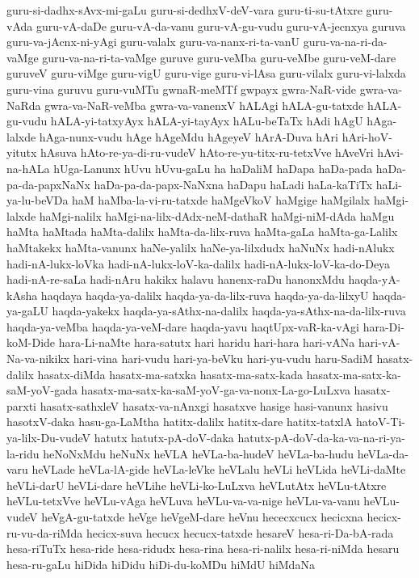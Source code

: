 {guru-si-dadhx-sAvx-mi-gaLu
guru-si-dedhxV-deV-vara
guru-ti-su-tAtxre
guru-vAda
guru-vA-daDe
guru-vA-da-vanu
guru-vA-gu-vudu
guru-vA-jecnxya
guruva
guru-va-jAcnx-ni-yAgi
guru-valalx
guru-va-nanx-ri-ta-vanU
guru-va-na-ri-da-vaMge
guru-va-na-ri-ta-vaMge
guruve
guru-veMba
guru-veMbe
guru-veM-dare
guruveV
guru-viMge
guru-vigU
guru-vige
guru-vi-lAsa
guru-vilalx
guru-vi-lalxda
guru-vina
guruvu
guru-vuMTu
gwnaR-meMTf
gwpayx
gwra-NaR-vide
gwra-va-NaRda
gwra-va-NaR-veMba
gwra-va-vanenxV
hALAgi
hALA-gu-tatxde
hALA-gu-vudu
hALA-yi-tatxyAyx
hALA-yi-tayAyx
hALu-beTaTx
hAdi
hAgU
hAga-lalxde
hAga-nunx-vudu
hAge
hAgeMdu
hAgeyeV
hArA-Duva
hAri
hAri-hoV-yitutx
hAsuva
hAto-re-ya-di-ru-vudeV
hAto-re-yu-titx-ru-tetxVve
hAveVri
hAvi-na-hALa
hUga-Lanunx
hUvu
hUvu-gaLu
ha
haDaliM
haDapa
haDa-pada
haDa-pa-da-papxNaNx
haDa-pa-da-papx-NaNxna
haDapu
haLadi
haLa-kaTiTx
haLi-ya-lu-beVDa
haM
haMba-la-vi-ru-tatxde
haMgeVkoV
haMgige
haMgilalx
haMgi-lalxde
haMgi-nalilx
haMgi-na-lilx-dAdx-neM-dathaR
haMgi-niM-dAda
haMgu
haMta
haMtada
haMta-dalilx
haMta-da-lilx-ruva
haMta-gaLa
haMta-ga-Lalilx
haMtakekx
haMta-vanunx
haNe-yalilx
haNe-ya-lilxdudx
haNuNx
hadi-nAlukx
hadi-nA-lukx-loVka
hadi-nA-lukx-loV-ka-dalilx
hadi-nA-lukx-loV-ka-do-Deya
hadi-nA-re-saLa
hadi-nAru
hakikx
halavu
hanenx-raDu
hanonxMdu
haqda-yA-kAsha
haqdaya
haqda-ya-dalilx
haqda-ya-da-lilx-ruva
haqda-ya-da-lilxyU
haqda-ya-gaLU
haqda-yakekx
haqda-ya-sAthx-na-dalilx
haqda-ya-sAthx-na-da-lilx-ruva
haqda-ya-veMba
haqda-ya-veM-dare
haqda-yavu
haqtUpx-vaR-ka-vAgi
hara-Di-koM-Dide
hara-Li-naMte
hara-satutx
hari
haridu
hari-hara
hari-vANa
hari-vA-Na-va-nikikx
hari-vina
hari-vudu
hari-ya-beVku
hari-yu-vudu
haru-SadiM
hasatx-dalilx
hasatx-diMda
hasatx-ma-satxka
hasatx-ma-satx-kada
hasatx-ma-satx-ka-saM-yoV-gada
hasatx-ma-satx-ka-saM-yoV-ga-va-nonx-La-go-LuLxva
hasatx-parxti
hasatx-sathxleV
hasatx-va-nAnxgi
hasatxve
hasige
hasi-vanunx
hasivu
hasotxV-daka
hasu-ga-LaMtha
hatitx-dalilx
hatitx-dare
hatitx-tatxlA
hatoV-Ti-ya-lilx-Du-vudeV
hatutx
hatutx-pA-doV-daka
hatutx-pA-doV-da-ka-va-na-ri-ya-la-ridu
heNoNxMdu
heNuNx
heVLA
heVLa-ba-hudeV
heVLa-ba-hudu
heVLa-da-varu
heVLade
heVLa-lA-gide
heVLa-leVke
heVLalu
heVLi
heVLida
heVLi-daMte
heVLi-darU
heVLi-dare
heVLihe
heVLi-ko-LuLxva
heVLutAtx
heVLu-tAtxre
heVLu-tetxVve
heVLu-vAga
heVLuva
heVLu-va-va-nige
heVLu-va-vanu
heVLu-vudeV
heVgA-gu-tatxde
heVge
heVgeM-dare
heVnu
hececxcucx
hecicxna
hecicx-ru-vu-da-riMda
hecicx-suva
hecucx
hecucx-tatxde
hesareV
hesa-ri-Da-bA-rada
hesa-riTuTx
hesa-ride
hesa-ridudx
hesa-rina
hesa-ri-nalilx
hesa-ri-niMda
hesaru
hesa-ru-gaLu
hiDida
hiDidu
hiDi-du-koMDu
hiMdU
hiMdaNa
}
